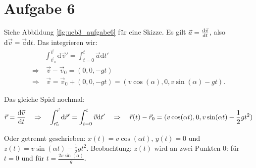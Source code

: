 \section*{Aufgabe 6}

Siehe Abbildung \ref{fig:ueb3_aufgabe6} für eine Skizze. Es gilt $\vec{a} = \frac{\mathrm{d}\vec{v}}{\mathrm{d}t}$, also $\mathrm{d} \vec{v} = \vec{a} \mathrm{d} t$. Das integrieren wir:
	\begin{align*}
		& \int_{\vec{v}_0}^{\vec{v}} \mathrm{d} \vec{v}' = \int_{t = 0}^{t} \vec{a} \mathrm{d} t' \\
		\Rightarrow &~ \vec{v} - \vec{v}_0 = (0, 0, -gt) \\
		\Rightarrow &~ \vec{v} = \vec{v}_0 + (0, 0, -gt) = (v \cos(\alpha), 0, v \sin(\alpha) - gt)
		\text{.}
	\end{align*}
	
	Das gleiche Spiel nochmal:
	\[
		\vec{r} = \frac{\mathrm{d}\vec{v}}{\mathrm{d}t} 
		\quad \Rightarrow \quad \int_{\vec{r_0}}^{\vec{r}} \mathrm{d} \vec{r}' = \int_{t = 0}^t \vec{v} \mathrm{d} t'
		\quad \Rightarrow \quad \vec{r}(t) - \vec{r}_0 = (v \cos(\alpha t), 0, v \sin(\alpha t) - \frac{1}{2} g t^2)
	\]
	
	Oder getrennt geschrieben: $x(t) = v \cos(\alpha t)$, $y(t) = 0$ und $z(t) = v \sin(\alpha t) - \frac{1}{2} g t^2$. Beobachtung: $z(t)$ wird an zwei Punkten $0$: für $t = 0$ und für $t = \frac{2 v \sin(\alpha)}{g}$.
	
